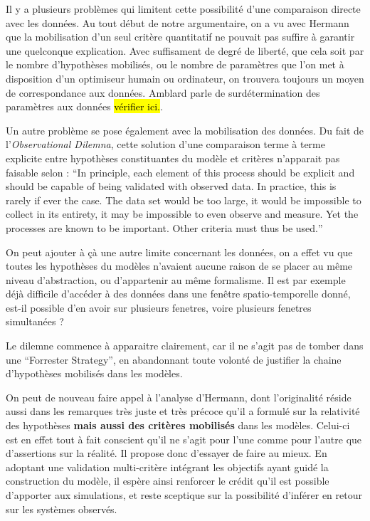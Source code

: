 


Il y a plusieurs problèmes qui limitent cette possibilité d'une comparaison directe avec les données. Au tout début de notre argumentaire, on a vu avec Hermann que la mobilisation d'un seul critère quantitatif ne pouvait pas suffire à garantir une quelconque explication. Avec suffisament de degré de liberté, que cela soit par le nombre d'hypothèses mobilisés, ou le nombre de paramètres que l'on met à disposition d'un optimiseur humain ou ordinateur, on trouvera toujours un moyen de correspondance aux données. Amblard parle de surdétermination des paramètres aux données \hl{vérifier ici.}.

Un autre problème se pose également avec la mobilisation des données. Du fait de l'\textit{Observational Dilemna}, cette solution d'une comparaison terme à terme explicite entre hypothèses constituantes du modèle et critères n'apparait pas faisable selon \textcite{Batty2001} : \foreignquote{english}{In principle, each element of this process should be explicit and should be capable of being validated with observed data. In practice, this is rarely if ever the case. The data set would be too large, it would be impossible to collect in its entirety, it may be impossible to even observe and measure. Yet the processes are known to be important. Other criteria must thus be used.} 

On peut ajouter à çà une autre limite concernant les données, on a effet vu que toutes les hypothèses du modèles n'avaient aucune raison de se placer au même niveau d'abstraction, ou d'appartenir au même formalisme. Il est par exemple déjà difficile d'accéder à des données dans une fenêtre spatio-temporelle donné, est-il possible d'en avoir sur plusieurs fenetres, voire plusieurs fenetres simultanées ? 

Le dilemne commence à apparaitre clairement, car il ne s'agit pas de tomber dans une \foreignquote{english}{Forrester Strategy}, en abandonnant toute volonté de justifier la chaine d'hypothèses mobilisés dans les modèles.

On peut de nouveau faire appel à l'analyse d'Hermann, dont l'originalité réside aussi dans les remarques très juste et très précoce qu'il a formulé sur la relativité des hypothèses \textbf{mais aussi des critères mobilisés} dans les modèles. Celui-ci est en effet tout à fait conscient qu'il ne s'agit pour l'une comme pour l'autre que d'assertions sur la réalité. Il propose donc d'essayer de faire au mieux. En adoptant une validation multi-critère  intégrant les objectifs ayant guidé la construction du modèle, il espère ainsi renforcer le crédit qu'il est possible d'apporter aux simulations, et reste sceptique sur la possibilité d'inférer en retour sur les systèmes observés.

